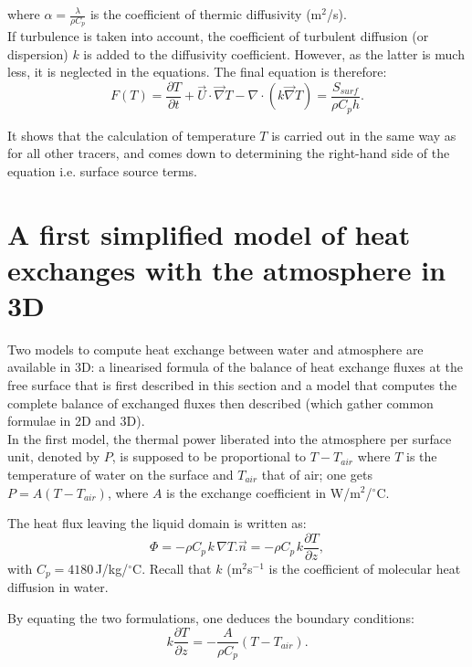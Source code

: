 where $\alpha = \frac{\lambda}{\rho C_p}$ is the coefficient of thermic diffusivity (m$^2$/s).\\

If turbulence is taken into account, the coefficient of turbulent diffusion
(or dispersion) $k$ is added to the diffusivity coefficient.
However, as the latter is much less, it is neglected in the equations.
The final equation is therefore:\\

\begin{equation}
  F(T) = \frac{\partial T}{\partial t} + \vec{U} \cdot \vec \nabla T
  - \nabla \cdot \left( k \vec \nabla T \right)
  = \frac{S_{surf}}{\rho C_p h}.
\end{equation}

It shows that the calculation of temperature $T$ is carried out in the same way
as for all other tracers, and comes down to determining the right-hand side
of the equation i.e. surface source terms.\\

\section{A first simplified model of heat exchanges with the atmosphere in 3D}

Two models to compute heat exchange between water and atmosphere are available
in 3D: a linearised formula of the balance of heat exchange fluxes at
the free surface that is first described in this section
and a model that computes the
complete balance of exchanged fluxes then described (which gather
common formulae in 2D and 3D).\\

In the first model, the thermal power liberated into the atmosphere per
surface unit, denoted by $P$, is supposed to be proportional to $T-T_{air}$
where $T$ is the temperature of water on the surface and $T_{air}$ that of
air; one gets $P=A(T-T_{air})$, where $A$ is the exchange coefficient in
W/m$^{2}$/${^{\circ}}$C.

The heat flux leaving the liquid domain is written as:
\begin{equation}
\Phi=-\rho C_{p\,}k\,\nabla T.\vec{n}=-\rho
C_{p\,}k\dfrac{\partial T}{\partial z},
\end{equation}
with $C_{p}=4180\,$J/kg/${^{\circ}}$C. Recall that $k$ (m$^2$s$^{-1}$ is the coefficient
of molecular heat diffusion in water.

By equating the two formulations, one deduces the boundary conditions:%
\begin{equation}
k\dfrac{\partial T}{\partial z}=-\dfrac{A}{\rho C_{p}}\left(
T-T_{air}\right).
\end{equation}

